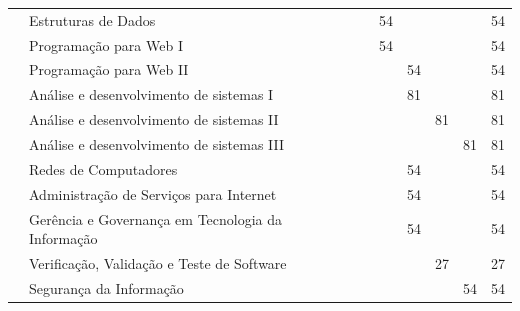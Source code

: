 \documentclass[11pt,fleqn]{book} %
\begin{document}
\begin{table}[]
{\begin{tabular}{|l|l|c|c|c|c|c|c|}
				& Estruturas de Dados                           &                      & 54                   &                      &                      &                      & 54            \\ \cline{2-8} 
				& Programação para Web I                        &                      & 54                   &                      &                      &                      & 54            \\ \cline{2-8} 
				& Programação para Web II                       &                      &                      & 54                   &                      &                      & 54            \\ \cline{2-8} 
				& Análise e desenvolvimento de sistemas I       &                      &                      & 81                   &                      &                      & 81            \\ \cline{2-8} 
				& Análise e desenvolvimento de sistemas II      &                      &                      &                      & 81                   &                      & 81            \\ \cline{2-8} 
				& Análise e desenvolvimento de sistemas III     &                      &                      &                      &                      & 81                   & 81            \\ \cline{2-8} 
				& Redes de Computadores                         &                      &                      & 54                   &                      &                      & 54            \\ \cline{2-8} 
				& Administração de Serviços para Internet       &                      &                      & 54                   &                      &                      & 54            \\ \cline{2-8} 
				& Gerência e Governança em Tecnologia da Informação                    &                      &                      & 54                   &                      &                      & 54            \\ \cline{2-8} 
				& Verificação, Validação e Teste de Software    &                      &                      &                      & 27                   &                      & 27            \\ \cline{2-8} 				
				& Segurança da Informação                       &                      &                      &                      &                      & 54                   & 54            \\ \cline{2-8} 

\end{tabular}}
\end{table}
\end{document}
